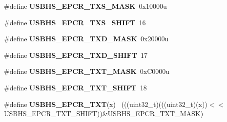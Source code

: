 \begin{DoxyCompactItemize}
\item 
\hypertarget{group___u_s_b_h_s___register___masks_gaffccc705e5926ce7041de8dd0d5f5648}{}\#define {\bfseries U\+S\+B\+H\+S\+\_\+\+E\+P\+C\+R\+\_\+\+T\+X\+S\+\_\+\+M\+A\+S\+K}~0x10000u\label{group___u_s_b_h_s___register___masks_gaffccc705e5926ce7041de8dd0d5f5648}

\item 
\hypertarget{group___u_s_b_h_s___register___masks_ga7232e8f54de9eb74832dcb6f122a8c56}{}\#define {\bfseries U\+S\+B\+H\+S\+\_\+\+E\+P\+C\+R\+\_\+\+T\+X\+S\+\_\+\+S\+H\+I\+F\+T}~16\label{group___u_s_b_h_s___register___masks_ga7232e8f54de9eb74832dcb6f122a8c56}

\item 
\hypertarget{group___u_s_b_h_s___register___masks_ga1a1a0ed8b08d5a3693e1b001a0f52575}{}\#define {\bfseries U\+S\+B\+H\+S\+\_\+\+E\+P\+C\+R\+\_\+\+T\+X\+D\+\_\+\+M\+A\+S\+K}~0x20000u\label{group___u_s_b_h_s___register___masks_ga1a1a0ed8b08d5a3693e1b001a0f52575}

\item 
\hypertarget{group___u_s_b_h_s___register___masks_ga52212105934f9e9f86d86824d86dd5aa}{}\#define {\bfseries U\+S\+B\+H\+S\+\_\+\+E\+P\+C\+R\+\_\+\+T\+X\+D\+\_\+\+S\+H\+I\+F\+T}~17\label{group___u_s_b_h_s___register___masks_ga52212105934f9e9f86d86824d86dd5aa}

\item 
\hypertarget{group___u_s_b_h_s___register___masks_gaa51e9c47ae5338122a1319ad2a317845}{}\#define {\bfseries U\+S\+B\+H\+S\+\_\+\+E\+P\+C\+R\+\_\+\+T\+X\+T\+\_\+\+M\+A\+S\+K}~0x\+C0000u\label{group___u_s_b_h_s___register___masks_gaa51e9c47ae5338122a1319ad2a317845}

\item 
\hypertarget{group___u_s_b_h_s___register___masks_ga289db9407aa072d29a025dc3baada79f}{}\#define {\bfseries U\+S\+B\+H\+S\+\_\+\+E\+P\+C\+R\+\_\+\+T\+X\+T\+\_\+\+S\+H\+I\+F\+T}~18\label{group___u_s_b_h_s___register___masks_ga289db9407aa072d29a025dc3baada79f}

\item 
\hypertarget{group___u_s_b_h_s___register___masks_ga6624a309b95677e41a114a1f790cec80}{}\#define {\bfseries U\+S\+B\+H\+S\+\_\+\+E\+P\+C\+R\+\_\+\+T\+X\+T}(x)                                            ~(((uint32\+\_\+t)(((uint32\+\_\+t)(x))$<$$<$U\+S\+B\+H\+S\+\_\+\+E\+P\+C\+R\+\_\+\+T\+X\+T\+\_\+\+S\+H\+I\+F\+T))\&U\+S\+B\+H\+S\+\_\+\+E\+P\+C\+R\+\_\+\+T\+X\+T\+\_\+\+M\+A\+S\+K)\label{group___u_s_b_h_s___register___masks_ga6624a309b95677e41a114a1f790cec80}


\end{DoxyCompactItemize}
